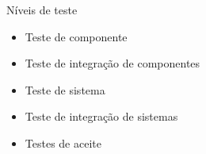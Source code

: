 
\begin{frame}{Níveis de teste}
    \begin{itemize}
        \item Teste de componente
        \item Teste de integração de componentes
        \item Teste de sistema
        \item Teste de integração de sistemas
        \item Testes de aceite
    \end{itemize}
\end{frame}
